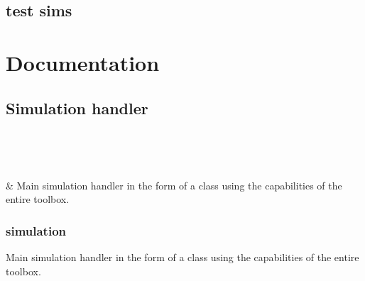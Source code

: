 \documentclass[letterpaper,10pt,english]{sphinxmanual}
\begin{document}
\section{test sims}
\label{\detokenize{usage_examples:test-sims}}

\chapter{Documentation}
\label{\detokenize{modules/doc:documentation}}\label{\detokenize{modules/doc::doc}}

\section{Simulation handler}
\label{\detokenize{modules/doc:simulation-handler}}

\begin{savenotes}\sphinxatlongtablestart\begin{longtable}{}
\hline

\endfirsthead

%
{}\\
\hline

\endhead

\hline
{}\\
\endfoot

\endlastfoot

{\hyperref[\detokenize{modules/simulation:module-simulation}]{}}
&
Main simulation handler in the form of a class using the capabilities of the entire toolbox.
\\
\hline
\end{longtable}\sphinxatlongtableend\end{savenotes}


\subsection{simulation}
\label{\detokenize{modules/simulation:module-simulation}}\label{\detokenize{modules/simulation:simulation}}\label{\detokenize{modules/simulation::doc}}
Main simulation handler in the form of a class using the capabilities of the entire toolbox.
\end{document}
